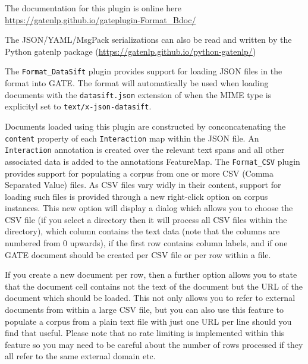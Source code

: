 The documentation for this plugin is online here \url{https://gatenlp.github.io/gateplugin-Format_Bdoc/}

The JSON/YAML/MsgPack serializations can also be read and written by the
Python gatenlp package (\url{https://gatenlp.github.io/python-gatenlp/})

%
%
The \verb!Format_DataSift! plugin provides support for loading JSON files in the
 format into GATE. The format will
automatically be used when loading documents with the \verb!datasift.json!
extension of when the MIME type is explicityl set to \verb!text/x-json-datasift!.

Documents loaded using this plugin are constructed by conconcatenating the
\verb!content! property of each \verb!Interaction! map within the JSON file.
An \verb!Interaction! annotation is created over the relevant text spans and
all other associated data is added to the annotations FeatureMap.
%
%
The \verb!Format_CSV! plugin provides support for populating a corpus from one
or more CSV (Comma Separated Value) files. As CSV files vary widly in their
content, support for loading such files is provided through a new right-click
option on corpus instances. This new option will display a dialog which allows
you to choose the CSV file (if you select a directory then it will process all
CSV files within the directory), which column contains the text data (note that
the columns are numbered from 0 upwards), if the first row contains column labels,
and if one GATE document should be created per CSV file or per row within a file.

If you create a new document per row, then a further option allows you to state
that the document cell contains not the text of the document but the URL of the
document which should be loaded. This not only allows you to refer to external
documents from within a large CSV file, but you can also use this feature to
populate a corpus from a plain text file with just one URL per line should
you find that useful. Please note that no rate limiting is implemented within
this feature so you may need to be careful about the number of rows processed
if they all refer to the same external domain etc.

